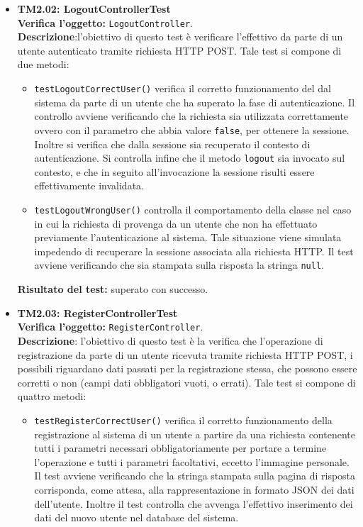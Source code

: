 \begin{itemize}
\item \textbf{TM2.02: LogoutControllerTest}\\
\textbf{Verifica l'oggetto:} \texttt{LogoutController}.\\
\textbf{Descrizione}:l'obiettivo di questo test è verificare l'effettivo  da parte di un utente autenticato tramite richiesta HTTP POST.
Tale test si compone di due metodi:

\begin{itemize}

\item \texttt{testLogoutCorrectUser()} verifica il corretto funzionamento del  dal sistema da parte di un utente che ha superato la fase di autenticazione. Il controllo avviene verificando che la richiesta sia utilizzata correttamente ovvero con il parametro che abbia valore \texttt{false}, per ottenere la sessione. Inoltre si verifica che dalla sessione sia recuperato il contesto di autenticazione. Si controlla infine che il metodo \texttt{logout} sia invocato sul contesto, e che in seguito all'invocazione la sessione risulti essere effettivamente invalidata.

\item \texttt{testLogoutWrongUser()}  controlla il comportamento della classe nel caso in cui la richiesta di  provenga da un utente che non ha effettuato previamente l'autenticazione al sistema. Tale situazione viene simulata impedendo di recuperare la sessione associata alla richiesta HTTP. Il test avviene verificando che sia stampata sulla risposta la stringa \texttt{null}.
\end{itemize}
\textbf{Risultato del test:} superato con successo.

\item \textbf{TM2.03: RegisterControllerTest}\\
\textbf{Verifica l'oggetto:} \texttt{RegisterController}.\\
\textbf{Descrizione}: l'obiettivo di questo test è la verifica che l'operazione di registrazione da parte di un utente ricevuta tramite richiesta HTTP POST, i possibili  riguardano dati passati per la registrazione stessa, che possono essere corretti o non (campi dati obbligatori vuoti, o errati).
Tale test si compone di quattro metodi:
\begin{itemize}
\item \texttt{testRegisterCorrectUser()} verifica il corretto funzionamento della registrazione al sistema di un utente a partire da una richiesta contenente tutti i parametri necessari obbligatoriamente per portare a termine l'operazione e tutti i parametri facoltativi, eccetto l'immagine personale. 
Il test avviene verificando che la stringa stampata sulla pagina di risposta corrisponda, come attesa, alla rappresentazione in formato JSON dei dati dell'utente. Inoltre il test controlla che avvenga l'effettivo inserimento dei dati del nuovo utente nel database del sistema.


\end{itemize}
\end{itemize}
